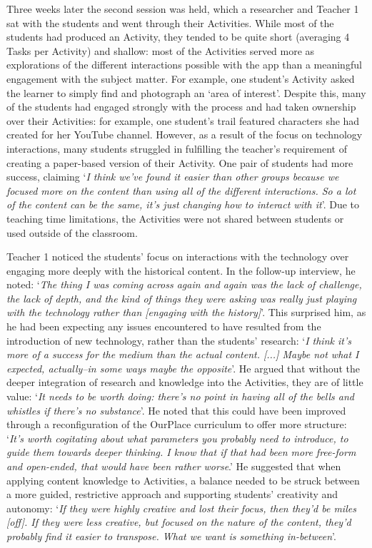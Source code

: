 \documentclass[,hyphens]{sigchi}
\begin{document}
Three weeks later the second session was held, which a researcher and Teacher 1 sat with the students and went through their Activities. While most of the students had produced an Activity, they tended to be quite short (averaging 4 Tasks per Activity) and shallow: most of the Activities served more as explorations of the different interactions possible with the app than a meaningful engagement with the subject matter. For example, one student's Activity asked the learner to simply find and photograph an `area of interest'. Despite this, many of the students had engaged strongly with the process and had taken ownership over their Activities: for example, one student's trail featured characters she had created for her YouTube channel. However, as a result of the focus on technology interactions, many students struggled in fulfilling the teacher's requirement of creating a paper-based version of their Activity. One pair of students had more success, claiming `\textit{I think we've found it easier than other groups because we focused more on the content than using all of the different interactions. So a lot of the content can be the same, it's just changing how to interact with it}'. Due to teaching time limitations, the Activities were not shared between students or used outside of the classroom.

Teacher 1 noticed the students' focus on interactions with the technology over engaging more deeply with the historical content. In the follow-up interview, he noted: `\textit{The thing I was coming across again and again was the lack of challenge, the lack of depth, and the kind of things they were asking was really just playing with the technology rather than [engaging with the history]}'. This surprised him, as he had been expecting any issues encountered to have resulted from the introduction of new technology, rather than the students' research: `\textit{I think it's more of a success for the medium than the actual content. [...] Maybe not what I expected, actually--in some ways maybe the opposite}'. He argued that without the deeper integration of research and knowledge into the Activities, they are of little value: `\textit{It needs to be worth doing: there's no point in having all of the bells and whistles if there's no substance}'. He noted that this could have been improved through a reconfiguration of the OurPlace curriculum to offer more structure: `\textit{It's worth cogitating about what parameters you probably need to introduce, to guide them towards deeper thinking. I know that if that had been more free-form and open-ended, that would have been rather worse}.' He suggested that when applying content knowledge to Activities, a balance needed to be struck between a more guided, restrictive approach and supporting students' creativity and autonomy: `\textit{If they were highly creative and lost their focus, then they'd be miles [off]. If they were less creative, but focused on the nature of the content, they'd probably find it easier to transpose. What we want is something in-between}'.
\end{document}

